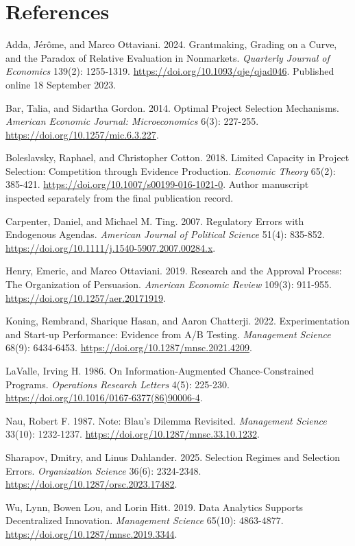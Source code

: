 \documentclass[
  11pt,
]{article}
\begin{document}
{
\small
\setlength{\parindent}{0pt}
\section*{References}\label{references}

Adda, Jérôme, and Marco Ottaviani. 2024. Grantmaking, Grading on a
Curve, and the Paradox of Relative Evaluation in Nonmarkets.
\emph{Quarterly Journal of Economics} 139(2): 1255-1319.
\url{https://doi.org/10.1093/qje/qjad046}. Published online 18 September 2023.

Bar, Talia, and Sidartha Gordon. 2014. Optimal Project Selection
Mechanisms. \emph{American Economic Journal: Microeconomics} 6(3):
227-255. \url{https://doi.org/10.1257/mic.6.3.227}.

Boleslavsky, Raphael, and Christopher Cotton. 2018. Limited Capacity in
Project Selection: Competition through Evidence Production.
\emph{Economic Theory} 65(2): 385-421.
\url{https://doi.org/10.1007/s00199-016-1021-0}. Author manuscript inspected
separately from the final publication record.

Carpenter, Daniel, and Michael M. Ting. 2007. Regulatory Errors with
Endogenous Agendas. \emph{American Journal of Political Science} 51(4):
835-852. \url{https://doi.org/10.1111/j.1540-5907.2007.00284.x}.

Henry, Emeric, and Marco Ottaviani. 2019. Research and the Approval
Process: The Organization of Persuasion. \emph{American Economic Review}
109(3): 911-955. \url{https://doi.org/10.1257/aer.20171919}.

Koning, Rembrand, Sharique Hasan, and Aaron Chatterji. 2022.
Experimentation and Start-up Performance: Evidence from A/B Testing.
\emph{Management Science} 68(9): 6434-6453.
\url{https://doi.org/10.1287/mnsc.2021.4209}.

LaValle, Irving H. 1986. On Information-Augmented Chance-Constrained
Programs. \emph{Operations Research Letters} 4(5): 225-230.
\url{https://doi.org/10.1016/0167-6377(86)90006-4}.

Nau, Robert F. 1987. Note: Blau's Dilemma Revisited. \emph{Management
Science} 33(10): 1232-1237. \url{https://doi.org/10.1287/mnsc.33.10.1232}.

Sharapov, Dmitry, and Linus Dahlander. 2025. Selection Regimes and
Selection Errors. \emph{Organization Science} 36(6): 2324-2348.
\url{https://doi.org/10.1287/orsc.2023.17482}.

Wu, Lynn, Bowen Lou, and Lorin Hitt. 2019. Data Analytics Supports
Decentralized Innovation. \emph{Management Science} 65(10): 4863-4877.
\url{https://doi.org/10.1287/mnsc.2019.3344}.

}
\clearpage
\end{document}
